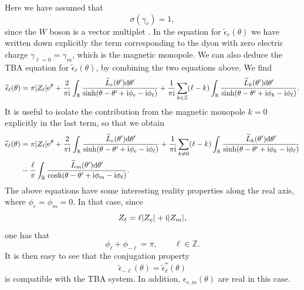 \documentclass[a4paper,11pt]{article}
\theoremstyle{definition}
\def\IZ{{\mathbb Z}}
\def\IR{{\mathbb R}}
\newcommand{\re}{{\rm e}}
\newcommand{\ri}{{\rm i}}
\newcommand{\rd}{{\rm d}}
\newcommand{\ba}{\begin{aligned}}
\newcommand{\ea}{\end{aligned}}
\def\IR{\mathbb{R}}
\def\IZ{\mathbb{Z}}
\begin{document}
%
Here we have assumed that
%
\begin{equation}
  \sigma(\gamma_e)=1, 
\end{equation}
%
since the $W$ boson is a vector multiplet \cite{gmn2}. In the equation
for $\widetilde \epsilon_e(\theta)$ we have written down explicitly
the term corresponding to the dyon with zero electric charge
$\gamma_{\ell=0}=\gamma_m$, which is the magnetic monopole.  We can
also deduce the TBA equation for $\widetilde \epsilon_{\ell}(\theta)$,
by combining the two equations above. We find
%
\begin{equation}
\label{dyon-eps}
\widetilde \epsilon_\ell (\theta)=\pi |Z_\ell|  \re^\theta+{2\over \pi
  \ri} \int_\IR {\widetilde L_e (\theta')  \rd \theta' \over
  \sinh(\theta-\theta'+\ri \phi_e- \ri \phi_\ell)} +  
{1\over \pi \ri}  \sum_{k\in \IZ} (\ell-k) \int_\IR {\widetilde
  L_k(\theta') \rd \theta' \over \sinh(\theta-\theta'+\ri \phi_k- \ri
  \phi_\ell)}.  
\end{equation}
%
It is useful to isolate the contribution from the magnetic monopole
$k=0$ explicitly in the last term, so that we obtain
%
\begin{equation}
  \ba
  \label{dyon-eps2}
  \widetilde \epsilon_\ell (\theta)&=\pi |Z_\ell|  \re^\theta+{2\over
    \pi \ri} \int_\IR {\widetilde L_e (\theta')  \rd \theta' \over
    \sinh(\theta-\theta'+\ri \phi_e- \ri \phi_\ell)}  +  
  {1\over \pi \ri}  \sum_{k\not=0} (\ell-k) \int_\IR {\widetilde
    L_k(\theta')  \rd \theta'\over \sinh(\theta-\theta'+\ri \phi_k-
    \ri \phi_\ell)}\\ 
  &-{\ell \over \pi}  \int_\IR {\widetilde L_m(\theta')  \rd
    \theta'\over \cosh(\theta-\theta'+\ri \phi_m- \ri \phi_\ell)}. 
  \ea
\end{equation}
%
The above equations have some interesting reality properties along the
real axis, where $\phi_e=\phi_m=0$. In that case, since
%
\begin{equation}
  Z_\ell= \ell |Z_e| + \ri |Z_m|, 
\end{equation}
%
one has that
%
\begin{equation}
  \phi_{\ell}+ \phi_{-\ell}= \pi, \qquad \ell\in \IZ. 
\end{equation}
%
It is then easy to see that the conjugation property
\begin{equation}
  \widetilde \epsilon_{-\ell} (\theta)= \widetilde \epsilon^*_{\ell} (\theta)
\end{equation}
is compatible with the TBA system. In addition,
$\epsilon_{e,m}(\theta)$ are real in this case.
\end{document}

